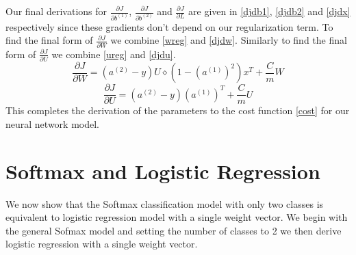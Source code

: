 \documentclass{article}
\begin{document}
Our final derivations for \(\frac{\partial J}{\partial b^{(1)}}\), \(\frac{\partial J}{\partial b^{(2)}}\) and \(\frac{\partial J}{\partial L}\) are given in \eqref{djdb1}, \eqref{djdb2} and \eqref{djdx} respectively since these gradients don't depend on our regularization term.  To find the final form of \(\frac{\partial J}{\partial W}\) we combine \eqref{wreg} and \eqref{djdw}.  Similarly to find the final form of \(\frac{\partial J}{\partial U}\) we combine \eqref{ureg} and \eqref{djdu}.
\begin{equation}
\frac{\partial J}{\partial W} = \left(a^{(2)} - y\right) U \diamond\left( 1-(a^{(1)})^2 \right) x^T +\frac{C}{m}W
\end{equation}
\begin{equation}
\frac{\partial J}{\partial U} = \left(a^{(2)} - y\right)(a^{(1)})^T + \frac{C}{m}U
\end{equation}
This completes the derivation of the parameters to the cost function \eqref{cost} for our neural network model.

\section{Softmax and Logistic Regression}

We now show that the Softmax classification model with only two classes is equivalent to logistic regression model with a single weight vector.  We begin with the general Sofmax model and setting the number of classes to 2 we then derive logistic regression with a single weight vector.
\end{document}
